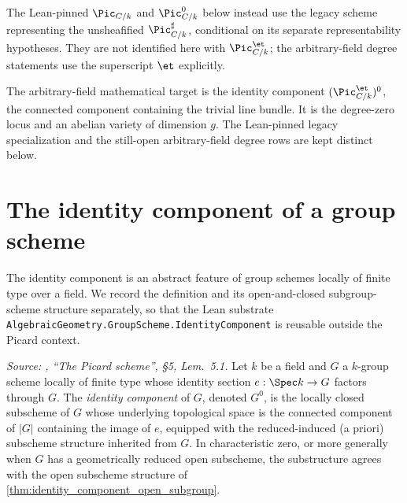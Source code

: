 The Lean-pinned \(\Pic_{C/k}\) and \(\Pic^0_{C/k}\) below instead use the
legacy scheme representing the unsheafified \(\Pic^\sharp_{C/k}\), conditional
on its separate representability hypotheses. They are not identified here
with \(\Pic^{\et}_{C/k}\); the arbitrary-field degree statements use the
superscript \(\et\) explicitly.

The arbitrary-field mathematical target is the identity component
\((\Pic^{\et}_{C/k})^0\), the connected component containing the trivial line
bundle. It is the degree-zero locus and an abelian variety of dimension \(g\).
The Lean-pinned legacy specialization and the still-open arbitrary-field degree
rows are kept distinct below.

\section{The identity component of a group scheme}
\label{sec:identity_component_abstract}

The identity component is an abstract feature of group schemes locally
of finite type over a field. We record the definition and its
open-and-closed subgroup-scheme structure separately, so that the
Lean substrate
\texttt{AlgebraicGeometry.GroupScheme.IdentityComponent} is reusable
outside the Picard context.

\begin{definition}\leanok
  \label{def:identity_component_group_scheme}
  \textit{Source: \cite{kleiman-picard}, ``The Picard scheme'', \S 5, Lem.~5.1.}
  Let \(k\) be a field and \(G\) a \(k\)-group scheme locally of finite type
  whose identity section \(e : \Spec k \to G\) factors through \(G\). The
  \emph{identity component} of \(G\), denoted \(G^0\), is the locally closed
  subscheme of \(G\) whose underlying topological space is the connected
  component of \(|G|\) containing the image of \(e\), equipped with the
  reduced-induced (a priori) subscheme structure inherited from \(G\).
  In characteristic zero, or more generally when \(G\) has a
  geometrically reduced open subscheme, the substructure agrees with
  the open subscheme structure of \cref{thm:identity_component_open_subgroup}.
\end{definition}

